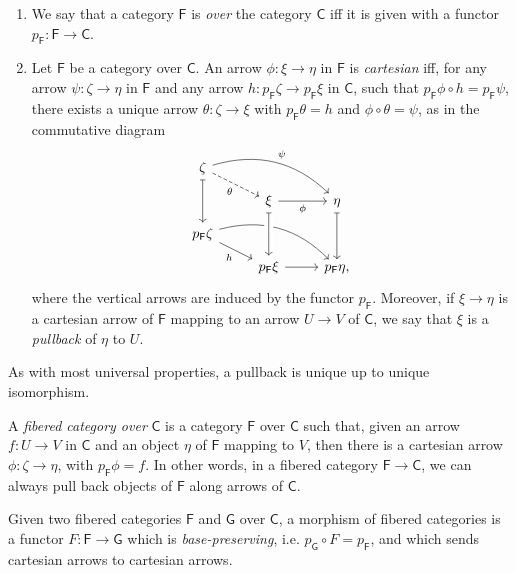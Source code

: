 \documentclass[../Main]{subfiles}
\begin{document}
\begin{defn}\leavevmode\vspace{-\baselineskip}
\begin{enumerate}
	\item We say that a category $\mathsf{F}$ is {\em over} the category $\mathsf{C}$
		iff it is given with a functor $p_{\mathsf{F}}\colon \mathsf{F} \to \mathsf{C}$.

	\item Let $\mathsf{F}$ be a category over $\mathsf{C}$.
		An arrow $\phi\colon \xi \to \eta$ in $\mathsf{F}$ is {\em cartesian}
		iff, for any arrow $\psi\colon \zeta \to \eta$ in $\mathsf{F}$
		and any arrow $h\colon p_{\mathsf{F}}\zeta \to p_{\mathsf{F}}\xi$
		in $\mathsf{C}$, such that $p_{\mathsf{F}} \phi \circ h = p_{\mathsf{F}} \psi$,
		there exists a unique arrow $\theta\colon \zeta \to \xi$ with
		$p_{\mathsf{F}} \theta = h$ and $\phi \circ \theta = \psi$,
		as in the commutative diagram
		\begin{equation*}
		\begin{tikzcd}[row sep=0.75em]
			\zeta \arrow[rd, "\theta"', dashrightarrow] 
			\arrow[rrd, "\psi", rightarrow, bend left] 
			\arrow[dd, "", mapsto] & & \\
			&
			\xi \arrow[r, "\phi"', rightarrow] &
			\eta \arrow[dd, "", mapsto] \\
			p_{\mathsf{F}} \zeta \arrow[rd, "h"', rightarrow] 
			\arrow[rrd, "", rightarrow, bend left] & & \\
			&
			p_{\mathsf{F}} \xi \arrow[r, "", rightarrow] 
			\arrow[from=uu, "", mapsto, crossing over] &
			p_{\mathsf{F}} \eta
		,\end{tikzcd}
		\end{equation*}
		where the vertical arrows are induced by the functor $p_{\mathsf{F}}$.
		Moreover, if $\xi \to \eta$ is a cartesian arrow of $\mathsf{F}$
		mapping to an arrow $U \to V$ of $\mathsf{C}$,
		we say that $\xi$ is a {\em pullback} of $\eta$ to $U$.
\end{enumerate}
\end{defn}


\begin{rem}[]
	As with most universal properties, a pullback is unique
	up to unique isomorphism.
\end{rem}


\begin{defn}
	A {\em fibered category over} $\mathsf{C}$ is a category $\mathsf{F}$
	over $\mathsf{C}$ such that, given an arrow $f\colon U \to V$ in $\mathsf{C}$
	and an object $\eta$ of $\mathsf{F}$ mapping to $V$, then
	there is a cartesian arrow $\phi\colon \zeta \to \eta$, with $p_{\mathsf{F}} \phi = f$.
	In other words, in a fibered category $\mathsf{F} \to \mathsf{C}$,
	we can always pull back objects of $\mathsf{F}$ along arrows
	of $\mathsf{C}$.

	Given two fibered categories $\mathsf{F}$ and $\mathsf{G}$ over $\mathsf{C}$,
	a morphism of fibered categories is a functor $F\colon \mathsf{F} \to \mathsf{G}$
	which is {\em base-preserving}, i.e. $p_{\mathsf{G}} \circ F = p_{\mathsf{F}}$,
	and which sends cartesian arrows to cartesian arrows.
\end{defn}
\end{document}
